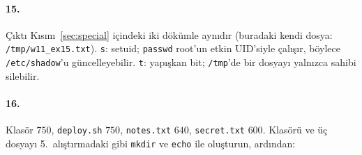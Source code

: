 \documentclass[11pt,a4paper]{article}
\newcommand{\cmd}[1]{\texttt{#1}}
\begin{document}
\paragraph{15.} Çıktı Kısım~\ref{sec:special} içindeki iki dökümle aynıdır (buradaki kendi dosya: \texttt{/tmp/w11\_ex15.txt}). \texttt{s}: setuid; \cmd{passwd} root'un etkin UID'siyle çalışır, böylece \texttt{/etc/shadow}'u güncelleyebilir. \texttt{t}: yapışkan bit; \texttt{/tmp}'de bir dosyayı yalnızca sahibi silebilir.

\paragraph{16.} Klasör $750$, \texttt{deploy.sh} $750$, \texttt{notes.txt} $640$, \texttt{secret.txt} $600$. Klasörü ve üç dosyayı 5.~alıştırmadaki gibi \cmd{mkdir} ve \cmd{echo} ile oluşturun, ardından:

\end{document}
